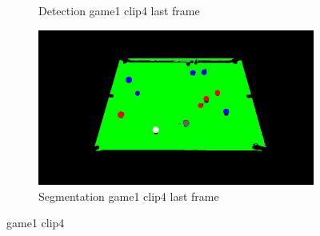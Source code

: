 \begin{figure}[H]
\begin{subfigure}[b]{0.35\textwidth}
        \caption{Detection game1 clip4 last frame}
        \label{fig: game1_clip4_last_frame_detected}
    \end{subfigure}
    \begin{subfigure}[b]{0.35\textwidth}
        \centering
        \includegraphics[width=\textwidth]{images/Segmentation/game1_clip4_segmented_balls_last_frame.jpg}
        \caption{Segmentation game1 clip4 last frame}
		\label{fig: game1_clip4_last_frame_segmented}
    \end{subfigure}
    
	\caption{game1 clip4}
\end{figure}


